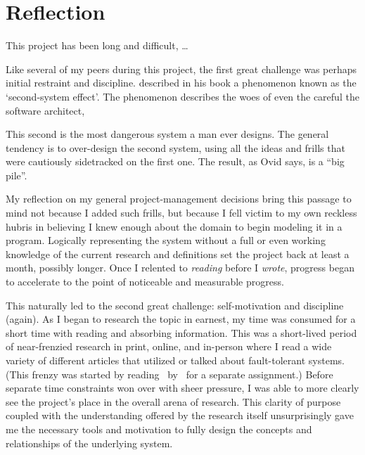 \section{Reflection}
\label{sec:reflection}

This project has been long and difficult, \dots

Like several of my peers during this project,
  the first great challenge was perhaps initial restraint and discipline.
\citeauthor{brooks:mythical-man-month} described in his book 
  a phenomenon known as the \enquote*{second-system effect}.
The phenomenon describes the woes of even the careful the software architect,
\begin{displayquote}
  This second is the most dangerous system a man ever designs.
  \Elide
  The general tendency is to over-design the second system,
    using all the ideas and frills that were cautiously sidetracked on the first one.
  The result, as Ovid says, is a \enquote{big pile}.
\end{displayquote}
My reflection on my general project-management decisions bring this passage to mind
  not because I added such frills, but because I fell victim to my own reckless hubris
  in believing I knew enough about the domain to begin modeling it in a program.
Logically representing the system without a full \Dash or even working \Dash
  knowledge of the current research and definitions set the project back at least a month, possibly longer.
Once I relented to \emph{reading} before I \emph{wrote},
  progress began to accelerate to the point of noticeable and measurable progress.

This naturally led to the second great challenge: self-motivation and discipline (again).
As I began to research the topic in earnest,
  my time was consumed for a short time with reading and absorbing information.
This was a short-lived period of near-frenzied research
  \Dash in print, online, and in-person \Dash
  where I read a wide variety of different articles that utilized or talked about fault-tolerant systems.
(This frenzy was started by reading~
  by~\citeauthor{goddard:ssa--k-distance} for a separate assignment.)
Before separate time constraints won over with sheer pressure,
  I was able to more clearly see the project's place in the overall arena of research.
This clarity of purpose \Dash
  coupled with the understanding offered by the research itself \Dash
  unsurprisingly gave me the necessary tools and motivation to fully design
  the concepts and relationships of the underlying system.

